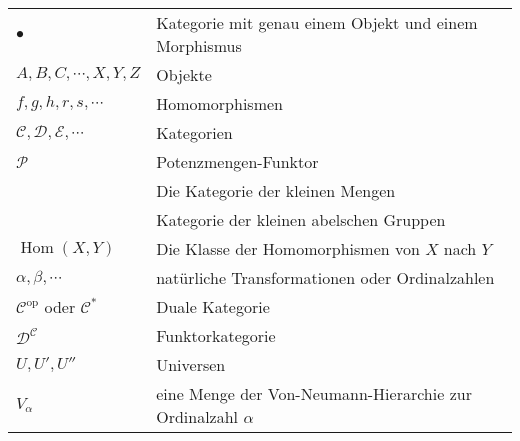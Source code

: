 \documentclass[a4paper]{amsart}
\theoremstyle{definition}
\DeclareMathOperator{\Hom}{Hom}
\newcommand{\CC}{\ensuremath{\mathcal{ C }}}
\newcommand{\DD}{\ensuremath{\mathcal{ D }}}
\newcommand{\PP}{\ensuremath{\mathcal{ P }}}
\newcommand{\Set}{\text{\textbf{Set}}}
\newcommand{\Ab}{\text{\textbf{Ab}}}
\begin{document}
\begin{tabular}{ll}
    $\bullet$                           & Kategorie mit genau einem Objekt und einem Morphismus\\
    $A, B, C, \cdots, X, Y, Z$          & Objekte\\
    $f, g, h, r, s, \cdots$             & Homomorphismen\\
    $\mathcal C, \mathcal D, \mathcal E, \cdots$ & Kategorien\\
    $\PP$                               & Potenzmengen-Funktor\\
    \Set                                & Die Kategorie der kleinen Mengen\\
    \Ab                                 & Kategorie der kleinen abelschen Gruppen\\
    $\Hom( X, Y)$                       & Die Klasse der Homomorphismen von $X$ nach $Y$\\
    $\alpha, \beta, \cdots$             & natürliche Transformationen oder Ordinalzahlen\\
    $\mathcal C ^{\text{op}}$ oder $\mathcal C ^{*}$         & Duale Kategorie\\
    $\DD^\CC$                           & Funktorkategorie\\
    $U, U', U''$                        & Universen\\
    $V_\alpha$                          & eine Menge der Von-Neumann-Hierarchie zur Ordinalzahl
                                          $\alpha$

\end{tabular}
\end{document}
